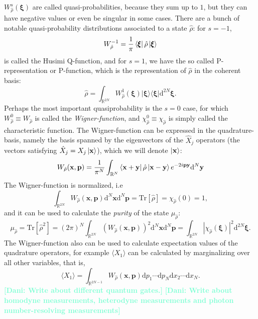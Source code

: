 \documentclass[12pt, a4paper,  nobibnotes]{article}
\newcommand{\op}[1]{\hat{#1}}
\newcommand{\ketbra}[2]{|#1\rangle\langle#2|}
\newcommand{\dd}{\mathrm{d}}
\newcommand{\Tr}[1]{\mathrm{Tr}\left[#1\right]}
\newcommand{\nd}[1]{\textcolor{Aquamarine}{\textbf{[Dani: #1]}}}
\begin{document}
$W_{\op\rho}^s(\pmb\xi)$ are called quasi-probabilities, because they sum up to
$1$, but they can have negative values or even be singular in some cases. 
There are a bunch of notable quasi-probability distributions associated to 
a state $\op\rho$: for $s=-1$, 
\begin{equation}
    W_{\op\rho}^{-1} = \frac{1}{\pi}\bra{\pmb\xi}\op\rho\ket{\pmb\xi}
\end{equation}
is called the Husimi Q-function, and for $s=1$, we have the so called P-representation or P-function,
which is the representation of $\op\rho$ in the coherent basis:
\begin{equation}
    \op\rho = \int_{\mathbb R^{2N}} W_{\op\rho}^1(\pmb\xi)\ketbra{\pmb\xi}{\pmb\xi}\dd^{2N}\pmb\xi.
\end{equation}
Perhaps the most important quasiprobability is the $s=0$ case, for which $W^{0}_{\op\rho}\equiv W_{\op\rho}$
is called the \textit{Wigner-function}, and $\chi_{\op\rho}^{0}\equiv \chi_{\op\rho}$ is simply called
the characteristic function.
The Wigner-function can be expressed in the quadrature-basis, namely the basis spanned by 
the eigenvectors of the $\op X_j$ operators (the vectors satisfying $\op X_j=X_j\ket{\mathbf x}$), 
which we will denote $\ket{\mathbf x}$:
\begin{equation}
    W_{\op\rho}(\mathbf x, \mathbf p) = \frac{1}{\pi^N}\int_{\mathbb R^N}\bra{\mathbf x + \mathbf y}
    \op\rho \ket{\mathbf x-\mathbf y}e^{-2i\mathbf p\mathbf y}\dd^{N}\mathbf y
\end{equation}
The Wigner-function is normalized, i.e
\begin{equation}
    \int_{\mathbb R^{2N}}W_{\op\rho}(\mathbf x, \mathbf p) \dd^{N}\mathbf x \dd^{N}\mathbf p = \Tr{\op \rho} = \chi_{\op\rho}(0) = 1,
\end{equation}
and it can be used to calculate the \textit{purity} of the state $\mu_{\op\rho}$:
\begin{equation}
    \mu_{\op\rho} = \Tr{\op\rho^2} = (2\pi)^N \int_{\mathbb R^{2N}}\left(W_{\op\rho}(\mathbf x, \mathbf p)\right)^2 \dd^{N}\mathbf x \dd^{N}\mathbf p
    = \int_{\mathbb R^{2N}} |\chi_{\op\rho}(\pmb\xi)|^2 \dd^{2N}\pmb\xi.
\end{equation}
The Wigner-function also can be used to calculate expectation values of the quadrature operators, 
for example $\langle X_1 \rangle$ can be calculated by marginalizing over all other variables, 
that is,
\begin{equation}
    \langle X_1 \rangle = \int_{\mathbb R^{2N-1}} W_{\op\rho}(\mathbf x, \mathbf p) \dd p_1 \cdots \dd p_N \dd x_2 \cdots \dd x_N.
\end{equation}
\nd{Write about different quantum gates.}
\nd{Write about homodyne measurements, heterodyne measurements and photon number-resolving measurements}
\end{document}
